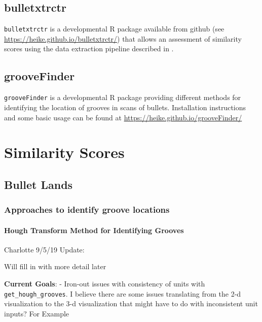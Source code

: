\documentclass[]{book}
\let\oldparagraph\paragraph
\renewcommand{\paragraph}[1]{\oldparagraph{#1}\mbox{}}
\begin{document}
\hypertarget{bulletxtrctr}{%
\subsection{bulletxtrctr}\label{bulletxtrctr}}

\texttt{bulletxtrctr} is a developmental R package available from github (see \url{https://heike.github.io/bulletxtrctr/}) that allows an assessment of similarity scores using the data extraction pipeline described in \citet{aoas}.

\hypertarget{groovefinder}{%
\subsection{grooveFinder}\label{groovefinder}}

\texttt{grooveFinder} is a developmental R package providing different methods for identifying the location of grooves in scans of bullets.
Installation instructions and some basic usage can be found at \url{https://heike.github.io/grooveFinder/}

\hypertarget{similarity-scores}{%
\section{Similarity Scores}\label{similarity-scores}}

\hypertarget{bullet-lands}{%
\subsection{Bullet Lands}\label{bullet-lands}}

\hypertarget{approaches-to-identify-groove-locations}{%
\subsubsection{Approaches to identify groove locations}\label{approaches-to-identify-groove-locations}}

\hypertarget{hough-transform-method-for-identifying-grooves}{%
\paragraph{Hough Transform Method for Identifying Grooves}\label{hough-transform-method-for-identifying-grooves}}

Charlotte 9/5/19 Update:

Will fill in with more detail later

\textbf{Current Goals}:
- Iron-out issues with consistency of units with \texttt{get\_hough\_grooves}. I believe there are some issues translating from the 2-d visualization to the 3-d visualization that might have to do with inconsistent unit inputs? For Example
\end{document}
